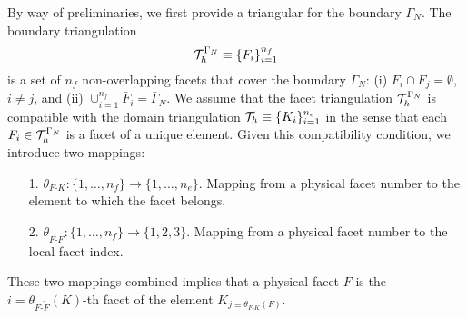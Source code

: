By way of preliminaries, we first provide a triangular for the boundary $\Gamma_N$.  The boundary triangulation
\begin{equation*}
  \mathcal{T}_h^{\Gamma_N} \equiv \{ F_i \}_{i=1}^{n_f}
\end{equation*}
is a set of $n_f$ non-overlapping facets that cover the boundary $\Gamma_N$: (i) $F_i \cap F_j = \emptyset$, $i \neq j$, and (ii) $\cup_{i=1}^{n_f} \bar F_i = \bar \Gamma_N$.  We assume that the facet triangulation $\mathcal{T}_h^{\Gamma_N}$ is compatible with the domain triangulation $\mathcal{T}_h \equiv \{ K_i \}_{i=1}^{n_e}$ in the sense that each $F_i \in \mathcal{T}_h^{\Gamma_N}$ is a facet of a unique element.  Given this compatibility condition, we introduce two mappings:
\begin{itemize}
\item[1.] $\theta_{F\text{-}K}: \{ 1,\dots,n_f\} \to \{1,\dots,n_e\}$. Mapping from a physical facet number to the element to which the facet belongs.
\item[2.] $\theta_{F\text{-}\tilde F}: \{1,\dots,n_f\} \to \{1,2,3\}$. Mapping from a physical facet number to the local facet index.
\end{itemize}
These two mappings combined implies that a physical facet $F$ is the $i = \theta_{F\text{-}\tilde F}(K)$-th facet of the element $K_{j \equiv \theta_{F\text{-}K}(F)}$.

